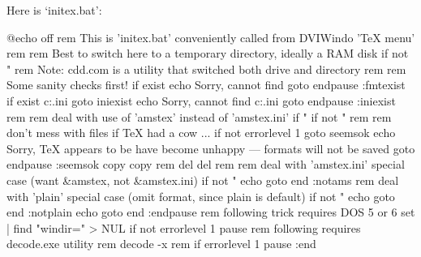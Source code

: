 Here is `initex.bat':

@echo off
rem This is 'initex.bat' conveniently called from DVIWindo 'TeX menu'
rem
rem Best to switch here to a temporary directory, ideally a RAM disk
if not "%
rem Note: cdd.com is a utility that switched both drive and directory
rem
rem Some sanity checks first!
if exist %
echo Sorry, cannot find %
goto endpause
:fmtexist
if exist c:\windows\dviwindo.ini goto iniexist
echo Sorry, cannot find c:\windows\dviwindo.ini
goto endpause
:iniexist
rem
rem deal with use of 'amstex' instead of 'amstex.ini'
if "%
if not "%
rem
rem don't mess with files if {\TeX} had a cow ...
if not errorlevel 1 goto seemsok
echo Sorry, {\TeX} appears to be have become unhappy --- formats will not be saved
goto endpause
:seemsok
copy %
copy %
rem
del %
del %
rem
rem deal with 'amstex.ini' special case (want &amstex, not &amstex.ini)
if not "%
echo %
goto end
:notams
rem deal with 'plain' special case (omit format, since plain is default)
if not "%
echo %
goto end
:notplain
echo %
goto end
:endpause
rem following trick requires DOS 5 or 6 
set | find "windir=" > NUL
if not errorlevel 1 pause
rem following requires decode.exe utility
rem decode -x
rem if errorlevel 1 pause
:end


